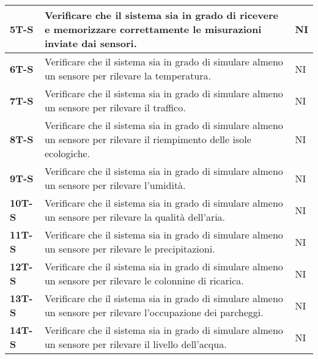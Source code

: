 \begin{longtable}{|>{\raggedright\arraybackslash}m{}|>{\raggedright\arraybackslash}m{}|>{\raggedright\arraybackslash}m{}|}
	\hline
	\textbf{5T-S}   & Verificare che il sistema sia in grado di ricevere e memorizzare correttamente le misurazioni inviate dai sensori.                                                                               & NI             \\
	\hline
	\textbf{6T-S}   & Verificare che il sistema sia in grado di simulare almeno un sensore per rilevare la temperatura.                                                                                                & NI             \\
	\hline
	\textbf{7T-S}   & Verificare che il sistema sia in grado di simulare almeno un sensore per rilevare il traffico.                                                                                                   & NI             \\
	\hline
	\textbf{8T-S}   & Verificare che il sistema sia in grado di simulare almeno un sensore per rilevare il riempimento delle isole ecologiche.                                                                         & NI             \\
	\hline
	\textbf{9T-S}   & Verificare che il sistema sia in grado di simulare almeno un sensore per rilevare l'umidità.                                                                                                     & NI             \\
	\hline
	\textbf{10T-S}  & Verificare che il sistema sia in grado di simulare almeno un sensore per rilevare la qualità dell'aria.                                                                                          & NI             \\
	\hline
	\textbf{11T-S}  & Verificare che il sistema sia in grado di simulare almeno un sensore per rilevare le precipitazioni.                                                                                             & NI             \\
	\hline
	\textbf{12T-S}  & Verificare che il sistema sia in grado di simulare almeno un sensore per rilevare le colonnine di ricarica.                                                                                      & NI             \\
	\hline
	\textbf{13T-S}  & Verificare che il sistema sia in grado di simulare almeno un sensore per rilevare l'occupazione dei parcheggi.                                                                                   & NI             \\
	\hline
	\textbf{14T-S}  & Verificare che il sistema sia in grado di simulare almeno un sensore per rilevare il livello dell'acqua.                                                                                         & NI             \\

\end{longtable}
